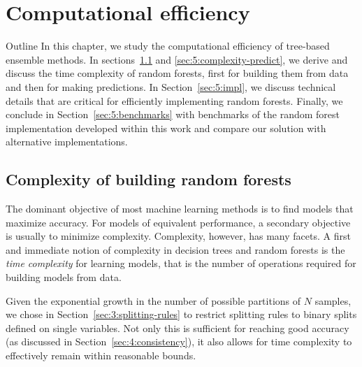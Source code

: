 \chapter{Computational efficiency}\label{ch:complexity}

\begin{remark}{Outline}
In this chapter, we study the computational efficiency of tree-based ensemble
methods. In sections~\ref{sec:5:complexity-fit} and \ref{sec:5:complexity-predict},
we derive and discuss the time complexity of random forests, first for building them from data and then for making predictions. In
Section~\ref{sec:5:impl}, we discuss technical details that are critical
for efficiently  implementing random forests. Finally, we conclude in
Section~\ref{sec:5:benchmarks} with benchmarks of the random forest implementation developed
within this work and compare our solution with alternative implementations.
\end{remark}

\section{Complexity of building random forests}
\label{sec:5:complexity-fit}

The dominant objective of most machine learning methods is to find models that
maximize accuracy. For models of equivalent performance, a secondary objective
is usually to minimize complexity. Complexity, however, has many facets. A
first and immediate notion of complexity in decision trees and random forests is
the \textit{time complexity} for learning models, that is the number of
operations required for building models from data.

Given the exponential growth in the number of possible partitions of $N$
samples, we chose in Section~\ref{sec:3:splitting-rules} to restrict splitting
rules to binary splits defined on single variables. Not only this is sufficient
for reaching good accuracy (as discussed in Section~\ref{sec:4:consistency}),
it also allows for time complexity to effectively remain within reasonable bounds.

